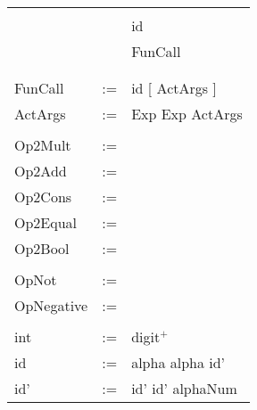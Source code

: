 \documentclass[14pt]{amsart}
\begin{document}
\begin{tabular}[t]{p{2.5cm} c p{10cm}}
		& \I & \tok{True}				\\
		& \I & id					\\
		& \I & FunCall					\\
		& \I & \tok{[]}					\\
&&\\
FunCall		& := & id \tok{(} [ ActArgs ] \tok{)}		\\
ActArgs		& := & Exp \I Exp \tok{,} ActArgs		\\
&&\\
Op2Mult		& := & \tok{$\ast$} \I \tok{/} \I \tok{\%} 	\\
Op2Add		& := & \tok{+} \I \tok{-}			\\
Op2Cons		& := & \tok{:}					\\
Op2Equal	& := & \tok{==} \I \tok{<} \I \tok{>} \I \tok{<=} \I \tok{>=} \I \tok{!=} \\
Op2Bool		& := & \tok{\&\&} \I \tok{||}			\\
&&\\
OpNot		& := & \tok{!}					\\
OpNegative	& := & \tok{-}					\\
&&\\
int		& := & digit$^+$				\\
id		& := & alpha \I alpha id'			\\
id'		& := & id' \tok{\_} \I id' alphaNum
\end{tabular}
\end{document}
